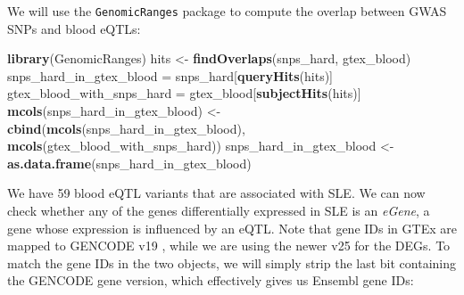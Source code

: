 \documentclass[9pt,a4paper,]{extarticle}
\newenvironment{Shaded}{\begin{snugshade}}{\end{snugshade}}
\newcommand{\KeywordTok}[1]{\textcolor[rgb]{0.13,0.29,0.53}{\textbf{#1}}}
\newcommand{\DataTypeTok}[1]{\textcolor[rgb]{0.13,0.29,0.53}{#1}}
\newcommand{\CharTok}[1]{\textcolor[rgb]{0.31,0.60,0.02}{#1}}
\newcommand{\StringTok}[1]{\textcolor[rgb]{0.31,0.60,0.02}{#1}}
\newcommand{\OtherTok}[1]{\textcolor[rgb]{0.56,0.35,0.01}{#1}}
\newcommand{\OperatorTok}[1]{\textcolor[rgb]{0.81,0.36,0.00}{\textbf{#1}}}
\newcommand{\NormalTok}[1]{#1}
\theoremstyle{definition}
\theoremstyle{definition}
\theoremstyle{definition}
\theoremstyle{remark}
\begin{document}
We will use the \texttt{GenomicRanges} package \citep{Lawrence2013} to compute the overlap between GWAS SNPs and blood eQTLs:

\begin{Shaded}
\begin{Highlighting}[]
\KeywordTok{library}\NormalTok{(GenomicRanges)}
\NormalTok{hits <-}\StringTok{ }\KeywordTok{findOverlaps}\NormalTok{(snps_hard, gtex_blood)}
\NormalTok{snps_hard_in_gtex_blood =}\StringTok{ }\NormalTok{snps_hard[}\KeywordTok{queryHits}\NormalTok{(hits)]}
\NormalTok{gtex_blood_with_snps_hard =}\StringTok{ }\NormalTok{gtex_blood[}\KeywordTok{subjectHits}\NormalTok{(hits)]}
\KeywordTok{mcols}\NormalTok{(snps_hard_in_gtex_blood) <-}\StringTok{ }\KeywordTok{cbind}\NormalTok{(}\KeywordTok{mcols}\NormalTok{(snps_hard_in_gtex_blood), }\KeywordTok{mcols}\NormalTok{(gtex_blood_with_snps_hard))}
\NormalTok{snps_hard_in_gtex_blood <-}\StringTok{ }\KeywordTok{as.data.frame}\NormalTok{(snps_hard_in_gtex_blood)}
\end{Highlighting}
\end{Shaded}

We have 59 blood eQTL variants that are associated with SLE.
We can now check whether any of the genes differentially expressed in SLE is an \emph{eGene}, a gene whose expression is influenced by an eQTL.
Note that gene IDs in GTEx are mapped to GENCODE v19 \citep{GTEx2017}, while we are using the newer v25 for the DEGs.
To match the gene IDs in the two objects, we will simply strip the last bit containing the GENCODE gene version, which effectively gives us Ensembl gene IDs:

\begin{Shaded}
\end{Shaded}
\end{document}
